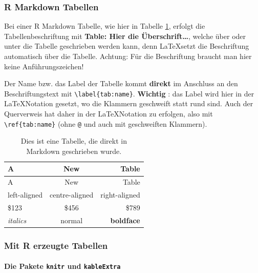 \documentclass[a4paper,12pt]{article}
\begin{document}
\hypertarget{r-markdown-tabellen}{%
\subsubsection{R Markdown Tabellen}\label{r-markdown-tabellen}}

Bei einer R Markdown Tabelle, wie hier in Tabelle \ref{tab:rmd_tab}, erfolgt die Tabellenbeschriftung mit \textbf{Table: Hier die Überschrift\ldots{}}, welche über oder unter die Tabelle geschrieben werden kann, denn \LaTeX setzt die Beschriftung automatisch über die Tabelle. Achtung: Für die Beschriftung braucht man hier keine Anführungszeichen!

Der Name bzw. das Label der Tabelle kommt \textbf{direkt} im Anschluss an den Beschriftungstext mit \texttt{\textbackslash{}label\{tab:name\}}. \textbf{Wichtig }: das Label wird hier in der \LaTeX Notation gesetzt, wo die Klammern geschweift statt rund sind. Auch der Querverweis hat daher in der \LaTeX Notation zu erfolgen, also mit \texttt{\textbackslash{}ref\{tab:name\}} (ohne \texttt{@} und auch mit geschweiften Klammern).
\begin{longtable}[]{@{}lcr@{}}
\caption{Dies ist eine Tabelle, die direkt in Markdown geschrieben wurde. \label{tab:rmd_tab}}\tabularnewline
\toprule
A & New & Table\tabularnewline
\midrule
\endfirsthead
\toprule
A & New & Table\tabularnewline
\midrule
\endhead
left-aligned & centre-aligned & right-aligned\tabularnewline
\$123 & \$456 & \$789\tabularnewline
\emph{italics} & normal & \textbf{boldface}\tabularnewline
\bottomrule
\end{longtable}
\hypertarget{mit-r-erzeugte-tabellen}{%
\subsubsection{Mit R erzeugte Tabellen}\label{mit-r-erzeugte-tabellen}}

\hypertarget{die-pakete-knitr-und-kableextra}{%
\paragraph{\texorpdfstring{Die Pakete \texttt{knitr} und \texttt{kableExtra}}{Die Pakete knitr und kableExtra}}\label{die-pakete-knitr-und-kableextra}}

~
\end{document}
